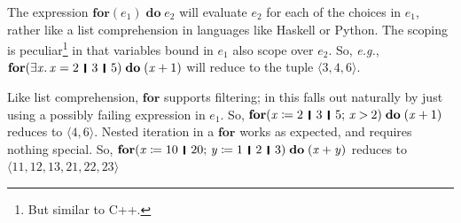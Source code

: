 \documentclass[acmsmall,review,anonymous,dvipsnames]{acmart}
\newcommand{\Varid}[1]{\mathit{#1}}
\newcommand{\eg}{\emph{e.g.}}
\begin{document}
The expression \ensuremath{\textbf{for} (\Varid{e}_{\mathrm{1}})\;\textbf{do}\;\Varid{e}_{\mathrm{2}}} will evaluate \ensuremath{\Varid{e}_{\mathrm{2}}} for each of the choices in \ensuremath{\Varid{e}_{\mathrm{1}}},
rather like a list comprehension in languages like Haskell or Python.
The scoping is peculiar\footnote{But similar to C++.}
in that variables bound in \ensuremath{\Varid{e}_{\mathrm{1}}} also scope over \ensuremath{\Varid{e}_{\mathrm{2}}}.
So, {\eg}, \ensuremath{\textbf{for} (\exists\Varid{x}.\,\Varid{x}\mathrel{=}\mathrm{2}\hspace{1mm}\mathop{\rule[-0.3mm]{0.5mm}{2.5mm}}\hspace{1mm}\mathrm{3}\hspace{1mm}\mathop{\rule[-0.3mm]{0.5mm}{2.5mm}}\hspace{1mm}\mathrm{5})\;\textbf{do}\;(\Varid{x}\mathbin{+}\mathrm{1})} will reduce to the tuple \ensuremath{\langle{}\mathrm{3},\mathrm{4},\mathrm{6}\rangle}.

Like list comprehension, \ensuremath{\textbf{for}} supports filtering; in \versecalc{} this falls out naturally by just using
a possibly failing expression in \ensuremath{\Varid{e}_{\mathrm{1}}}.
So, \ensuremath{\textbf{for} (\Varid{x}\mathrel{\coloneqq}\mathrm{2}\hspace{1mm}\mathop{\rule[-0.3mm]{0.5mm}{2.5mm}}\hspace{1mm}\mathrm{3}\hspace{1mm}\mathop{\rule[-0.3mm]{0.5mm}{2.5mm}}\hspace{1mm}\mathrm{5};\,\Varid{x}\mathbin{>}\mathrm{2})\;\textbf{do}\;(\Varid{x}\mathbin{+}\mathrm{1})} reduces to \ensuremath{\langle{}\mathrm{4},\mathrm{6}\rangle}.
Nested iteration in a \ensuremath{\textbf{for}} works as expected, and requires nothing special.
So, \ensuremath{\textbf{for} (\Varid{x}\mathrel{\coloneqq}\mathrm{10}\hspace{1mm}\mathop{\rule[-0.3mm]{0.5mm}{2.5mm}}\hspace{1mm}\mathrm{20};\,\Varid{y}\mathrel{\coloneqq}\mathrm{1}\hspace{1mm}\mathop{\rule[-0.3mm]{0.5mm}{2.5mm}}\hspace{1mm}\mathrm{2}\hspace{1mm}\mathop{\rule[-0.3mm]{0.5mm}{2.5mm}}\hspace{1mm}\mathrm{3})\;\textbf{do}\;(\Varid{x}\mathbin{+}\Varid{y})} reduces to \ensuremath{\langle{}\mathrm{11},\mathrm{12},\mathrm{13},\mathrm{21},\mathrm{22},\mathrm{23}\rangle}
\end{document}
